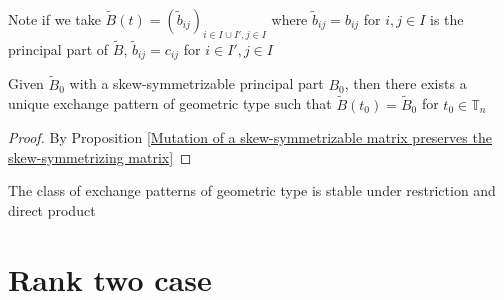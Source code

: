 \documentclass[main]{subfiles}
\begin{document}
\begin{remark}
Note if we take $\tilde B(t)=(\tilde b_{ij})_{i\in I\cup I',j\in I}$ where $\tilde b_{ij}=b_{ij}$ for $i,j\in I$ is the principal part of $\tilde B$, $\tilde b_{ij}=c_{ij}$ for $i\in I',j\in I$
\end{remark}

\begin{corollary}
Given $\tilde B_0$ with a skew-symmetrizable principal part $B_0$, then there exists a unique exchange pattern of geometric type such that $\tilde B(t_0)=\tilde B_0$ for $t_0\in\mathbb T_n$
\end{corollary}

\begin{proof}
By Proposition \ref{Mutation of a skew-symmetrizable matrix preserves the skew-symmetrizing matrix}
\end{proof}

\begin{remark}
The class of exchange patterns of geometric type is stable under restriction and direct product
\end{remark}



\section{Rank two case}
\end{document}
